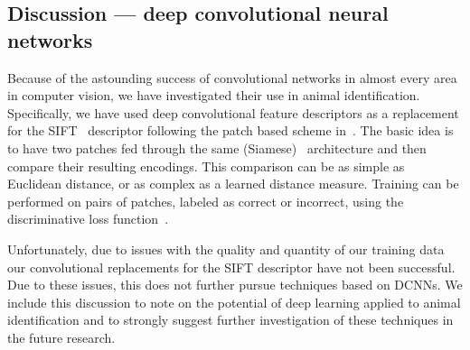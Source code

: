   \subsection{Discussion --- deep convolutional neural networks}\label{subsec:dcnndiscuss}

        Because of the astounding success of convolutional networks in
          almost every area in computer vision, we have investigated
          their use in animal identification.
        Specifically, we have used deep convolutional feature
          descriptors as a replacement for the
          SIFT~\cite{lowe_distinctive_2004} descriptor following the
          patch based scheme in~\cite{zagoruyko_learning_2015}.
        The basic idea is to have two patches
        fed through the same (Siamese)~\cite{chopra_learning_2005}
          architecture and then compare their resulting encodings.
        This comparison can be as simple as Euclidean distance, or as
          complex as a learned distance measure.
        Training can be performed on pairs of patches, labeled as
          correct or incorrect, using the discriminative loss
          function~\cite{lecun_loss_2005}.

        Unfortunately, due to issues with the quality and quantity of
          our training data our convolutional replacements for the SIFT
          descriptor have not been successful.
        Due to these issues, this \thesis{} does not further pursue
          techniques based on DCNNs.
        We include this discussion to note on the potential of deep
          learning applied to animal identification and to strongly
          suggest further investigation of these techniques in the future
          research.



